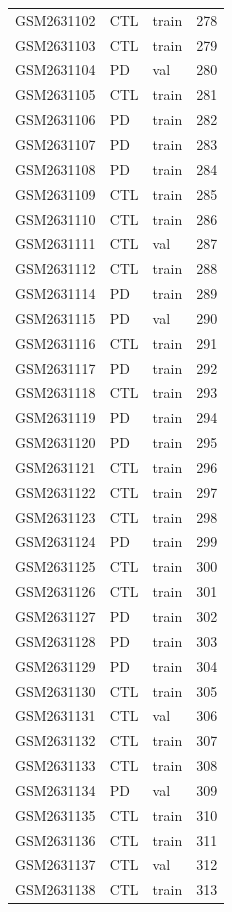 \begin{footnotesize}
\begin{longtable}{llll}
GSM2631102 & CTL & train & 278 \\
GSM2631103 & CTL & train & 279 \\
GSM2631104 & PD & val & 280 \\
GSM2631105 & CTL & train & 281 \\
GSM2631106 & PD & train & 282 \\
GSM2631107 & PD & train & 283 \\
GSM2631108 & PD & train & 284 \\
GSM2631109 & CTL & train & 285 \\
GSM2631110 & CTL & train & 286 \\
GSM2631111 & CTL & val & 287 \\
GSM2631112 & CTL & train & 288 \\
GSM2631114 & PD & train & 289 \\
GSM2631115 & PD & val & 290 \\
GSM2631116 & CTL & train & 291 \\
GSM2631117 & PD & train & 292 \\
GSM2631118 & CTL & train & 293 \\
GSM2631119 & PD & train & 294 \\
GSM2631120 & PD & train & 295 \\
GSM2631121 & CTL & train & 296 \\
GSM2631122 & CTL & train & 297 \\
GSM2631123 & CTL & train & 298 \\
GSM2631124 & PD & train & 299 \\
GSM2631125 & CTL & train & 300 \\
GSM2631126 & CTL & train & 301 \\
GSM2631127 & PD & train & 302 \\
GSM2631128 & PD & train & 303 \\
GSM2631129 & PD & train & 304 \\
GSM2631130 & CTL & train & 305 \\
GSM2631131 & CTL & val & 306 \\
GSM2631132 & CTL & train & 307 \\
GSM2631133 & CTL & train & 308 \\
GSM2631134 & PD & val & 309 \\
GSM2631135 & CTL & train & 310 \\
GSM2631136 & CTL & train & 311 \\
GSM2631137 & CTL & val & 312 \\
GSM2631138 & CTL & train & 313 \\

\end{longtable}
\end{footnotesize}
